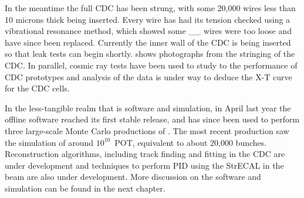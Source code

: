 \FigStatusCyDet
In the meantime the full \ac{CDC} has been strung, with some 20,000 wires less than 10 microns thick  being inserted.
Every wire has had its tension checked using a vibrational resonance method, which showed some \_\_  wires were too loose and have since been replaced.
Currently the inner wall of the CDC is being inserted so that leak tests can begin shortly.  
 shows photographs from the stringing of the \ac{CDC}.
In parallel, cosmic ray tests have been used to study to the performance of CDC prototypes and analysis of the data is under way to deduce the X-T curve for the CDC cells.

In the less-tangible realm that is software and simulation, in April last year the offline software reached its first stable release, and has since been used to perform three large-scale Monte Carlo productions of \phaseI.
The most recent production saw the simulation of around $10^{10}$~\ac{POT}, equivalent to about 20,000 bunches.  
Reconstruction algorithms, including track finding and fitting in the \ac{CDC} are under development and techniques to perform \ac{PID} using the \ac{StrECAL} in the \phaseI beam are also under development.
More discussion on the software and simulation can be found in the next chapter.
